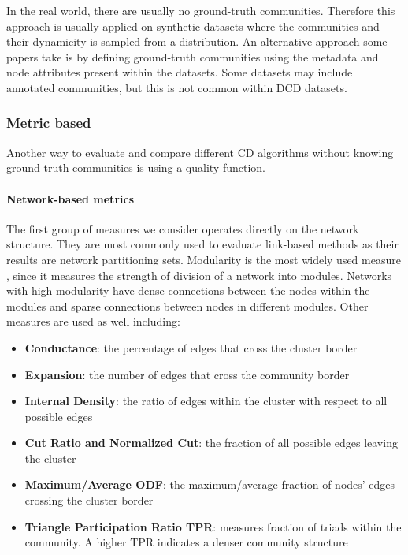 \documentclass[
acmsmall,
nonacm,
screen,
acmthm]{../../scripts/pandoc/templates/acmart}
\providecommand{\tightlist}{%
\setlength{\itemsep}{0pt}\setlength{\parskip}{0pt}}
\begin{document}
In the real world, there are usually no ground-truth communities.
Therefore this approach is usually applied on synthetic datasets where
the communities and their dynamicity is sampled from a distribution. An
alternative approach some papers take is by defining ground-truth
communities using the metadata and node attributes present within the
datasets. Some datasets may include annotated communities, but this is
not common within DCD datasets.

\hypertarget{metric-based}{%
\subsubsection{Metric based}\label{metric-based}}

Another way to evaluate and compare different CD algorithms without
knowing ground-truth communities is using a quality function.

\hypertarget{network-based-metrics}{%
\paragraph{Network-based metrics}\label{network-based-metrics}}

The first group of measures we consider operates directly on the network
structure. They are most commonly used to evaluate link-based methods as
their results are network partitioning sets. Modularity is the most
widely used measure
\citep{newmanFastAlgorithmDetecting2004, suComprehensiveSurveyCommunity2021},
since it measures the strength of division of a network into modules.
Networks with high modularity have dense connections between the nodes
within the modules and sparse connections between nodes in different
modules. Other measures are used as well including:

\begin{itemize}
\tightlist
\item
  \textbf{Conductance}: the percentage of edges that cross the cluster
  border
\item
  \textbf{Expansion}: the number of edges that cross the community
  border
\item
  \textbf{Internal Density}: the ratio of edges within the cluster with
  respect to all possible edges
\item
  \textbf{Cut Ratio and Normalized Cut}: the fraction of all possible
  edges leaving the cluster
\item
  \textbf{Maximum/Average ODF}: the maximum/average fraction of nodes'
  edges crossing the cluster border
\item
  \textbf{Triangle Participation Ratio TPR}: measures fraction of triads
  within the community. A higher TPR indicates a denser community
  structure
\end{itemize}
\end{document}
